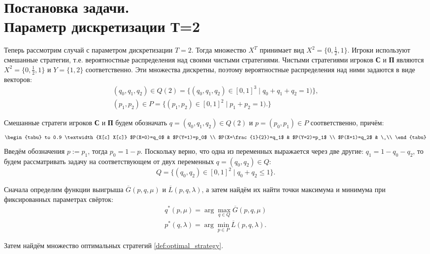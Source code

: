 \section{Постановка задачи.  \\Параметр дискретизации Т=2}

Теперь рассмотрим случай с параметром дискретизации $T=2$. Тогда множество 
$X^T$ принимает вид $X^2=\{0, \frac{1}{2}, 1\}$.
Игроки используют смешанные стратегии, т.е. вероятностные распределения над 
своими чистыми стратегиями.
Чистыми стратегиями игроков \textbf{С} и \textbf{П} являются 
$X^2=\{0, \frac{1}{2}, 1\}$ и $Y=\{1,2\}$ соответственно. 
Эти множества дискретны, поэтому вероятностные
распределения над ними задаются в виде векторов: 
\begin{gather*}
	(q_0, q_1, q_2) \in Q(2) = \{
		(q_0, q_1, q_2) \in [0,1]^3 \; | \; q_0 + q_1 + q_2 = 1)
	\},
	\\
	(p_1, p_2) \in P = \{
		(p_1, p_2) \in [0,1]^2 \; | \; p_1 + p_2 = 1).
	\}
\end{gather*}

Смешанные стратеги игроков \textbf{С} и \textbf{П} будем обозначать
$q=(q_0,q_1,q_2) \in Q(2)$ и $p=(p_0, p_1) \in P$ соответственно, причём:
\begin{equation}
\begin{tabu} to 0.9 \textwidth {X[c] X[c]}
	$P(X=0)=q_0$ & $P(Y=1)=p_0$ \\
	$P(X=\frac{1}{2})=q_1$ & $P(Y=2)=p_1$ \\
	$P(X=1)=q_2$ & \
	\\
	\end{tabu}	
\label{eq:probability_1}
\end{equation}
Введём обозначения $p := p_1$, тогда $p_0 = 1 - p$. Поскольку
верно, что одна из переменных выражается через две другие:
$q_1 = 1 - q_0 - q_2$, то будем рассматривать задачу на
соответствующем от двух переменных $q=(q_0, q_2) \in Q$:
$$
	Q = \{
		(q_0,q_2) \in [0,1]^2 \; | \;
		q_0 + q_2 \leqslant 1
	\}.
$$

Сначала определим функции выигрыша $\overline G(p, q, \mu)$
и $\overline L(p, q, \lambda)$, а затем найдём их
найти точки максимума и минимума при фиксированных параметрах
свёрток:
\begin{gather*}
	q^*(p, \mu) = \arg \max \limits_{q \in Q} \overline G(p, q, \mu)
	\\	
	p^*(q, \lambda) = \arg \min \limits_{p \in P} \overline L(p, q, \lambda).
\end{gather*}

Затем найдём множество оптимальных стратегий \eqref{def:optimal_strategy}.
